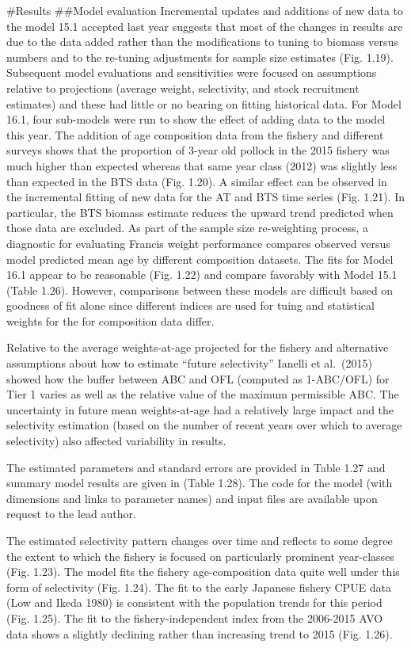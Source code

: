 \#Results \#\#Model evaluation Incremental updates and additions of new
data to the model 15.1 accepted last year suggests that most of the
changes in results are due to the data added rather than the
modifications to tuning to biomass versus numbers and to the re-tuning
adjustments for sample size estimates (Fig. 1.19). Subsequent model
evaluations and sensitivities were focused on assumptions relative to
projections (average weight, selectivity, and stock recruitment
estimates) and these had little or no bearing on fitting historical
data. For Model 16.1, four sub-models were run to show the effect of
adding data to the model this year. The addition of age composition data
from the fishery and different surveys shows that the proportion of
3-year old pollock in the 2015 fishery was much higher than expected
whereas that same year class (2012) was slightly less than expected in
the BTS data (Fig. 1.20). A similar effect can be observed in the
incremental fitting of new data for the AT and BTS time series (Fig.
1.21). In particular, the BTS biomass estimate reduces the upward trend
predicted when those data are excluded. As part of the sample size
re-weighting process, a diagnostic for evaluating Francis weight
performance compares observed versus model predicted mean age by
different composition datasets. The fits for Model 16.1 appear to be
reasonable (Fig. 1.22) and compare favorably with Model 15.1 (Table
1.26). However, comparisons between these models are difficult based on
goodness of fit alone since different indices are used for tuing and
statistical weights for the for composition data differ.

Relative to the average weights-at-age projected for the fishery and
alternative assumptions about how to estimate ``future selectivity''
Ianelli et al.~(2015) showed how the buffer between ABC and OFL
(computed as 1-ABC/OFL) for Tier 1 varies as well as the relative value
of the maximum permissible ABC. The uncertainty in future mean
weights-at-age had a relatively large impact and the selectivity
estimation (based on the number of recent years over which to average
selectivity) also affected variability in results.

The estimated parameters and standard errors are provided in Table 1.27
and summary model results are given in (Table 1.28). The code for the
model (with dimensions and links to parameter names) and input files are
available upon request to the lead author.

The estimated selectivity pattern changes over time and reflects to some
degree the extent to which the fishery is focused on particularly
prominent year-classes (Fig. 1.23). The model fits the fishery
age-composition data quite well under this form of selectivity (Fig.
1.24). The fit to the early Japanese fishery CPUE data (Low and Ikeda
1980) is consistent with the population trends for this period (Fig.
1.25). The fit to the fishery-independent index from the 2006-2015 AVO
data shows a slightly declining rather than increasing trend to 2015
(Fig. 1.26).

